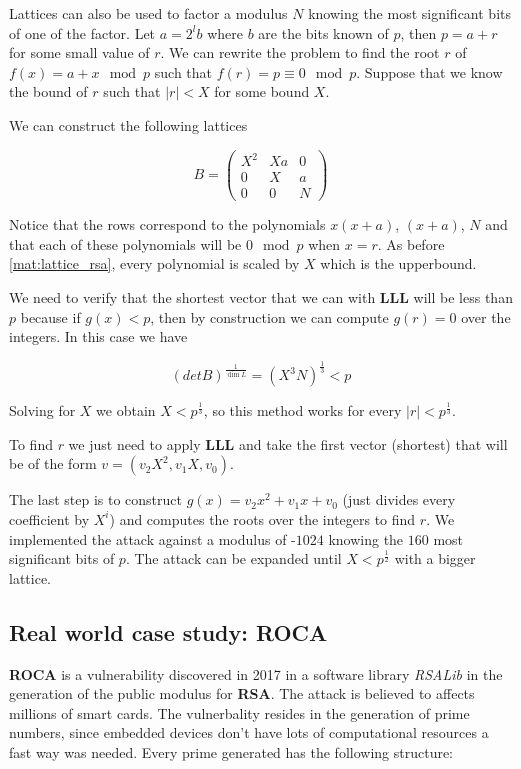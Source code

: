 \documentclass[a4paper,12pt]{report}
\begin{document}
Lattices can also be used to factor a modulus $N$ knowing the most significant bits of one of the factor.
Let $a = 2^lb$ where $b$ are the bits known of $p$, then $p = a + r$ for some small value of $r$.
We can rewrite the problem to find the root $r$ of $f(x) = a + x \mod p$ such that $f(r) = p \equiv 0 \mod p$.
Suppose that we know the bound of $r$ such that $|r| < X$ for some bound $X$.

We can construct the following lattices

\[
    B = 
    \begin{pmatrix}
        X^2 & Xa & 0 \\
        0 & X & a \\
        0 & 0 & N
    \end{pmatrix} 
\]

\vspace*{10px}

Notice that the rows correspond to the polynomials $x(x + a)$, $(x + a)$, $N$ and that each of these polynomials will
be $0 \mod p$ when $x = r$. As before \ref{mat:lattice_rsa}, every polynomial is scaled by $X$ which is the upperbound.

We need to verify that the shortest vector that we can with \textbf{LLL} will be less than $p$ because if $g(x) < p$,
then by construction we can compute $g(r) = 0$ over the integers.
In this case we have

\[
    (detB)^{\frac{1}{\dim L}} = (X^3N)^{\frac{1}{3}} < p
\]

Solving for $X$ we obtain $X < p^{\frac{1}{3}}$, so this method works for every $|r| < p^{\frac{1}{3}}$.

To find $r$ we just need to apply \textbf{LLL} and take the first vector (shortest) that will be of the form $v = (v_2X^2, v_1X, v_0)$.

The last step is to construct $g(x) = v_2x^2 + v_1x + v_0$ (just divides every coefficient by $X^i$)
and computes the roots over the integers to find $r$. We implemented the attack against a modulus
of -$1024$ knowing the $160$ most significant bits of $p$. The attack can be expanded
until $X < p^{\frac{1}{2}}$ with a bigger lattice.

\subsection{Real world case study: ROCA}

\textbf{ROCA}\cite{roca} is a vulnerability discovered in 2017 in a software library \textit{RSALib} in the generation
of the public modulus for \textbf{RSA}. The attack is believed to affects millions of smart cards. The vulnerbality
resides in the generation of prime numbers, since embedded devices don't have lots of computational resources a fast way
was needed. Every prime generated has the following structure:
\end{document}
